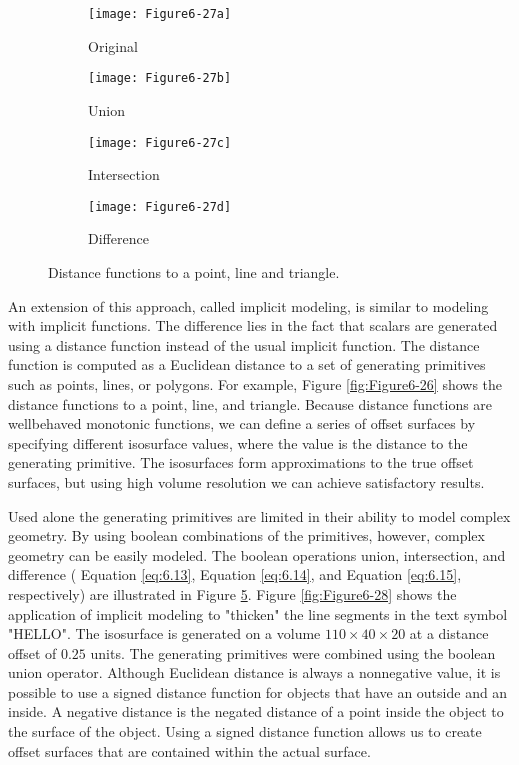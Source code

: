 \begin{figure}[htb]
	\begin{subfigure}[h]{0.24\linewidth}
		\texttt{[image: Figure6-27a]}
		\caption{Original}
		\label{fig:Figure6-27a}
	\end{subfigure}
	\hfill
	\begin{subfigure}[h]{0.24\linewidth}
		\texttt{[image: Figure6-27b]}
		\caption{Union}
		\label{fig:Figure6-27b}
	\end{subfigure}
	\hfill
	\begin{subfigure}[h]{0.24\linewidth}
		\texttt{[image: Figure6-27c]}
		\caption{Intersection}
		\label{fig:Figure6-27c}
	\end{subfigure}
	\begin{subfigure}[h]{0.24\linewidth}
		\texttt{[image: Figure6-27d]}
		\caption{Difference}
		\label{fig:Figure6-27d}
	\end{subfigure}
	\caption{Distance functions to a point, line and triangle.}\label{fig:Figure6-27}
\end{figure}

An extension of this approach, called implicit modeling, is similar to modeling with implicit functions. The difference lies in the fact that scalars are generated using a distance function instead of the usual implicit function. The distance function is computed as a Euclidean distance to a set of generating primitives such as points, lines, or polygons. For example, Figure \ref{fig:Figure6-26} shows the distance functions to a point, line, and triangle. Because distance functions are wellbehaved monotonic functions, we can define a series of offset surfaces by specifying different isosurface values, where the value is the distance to the generating primitive. The isosurfaces form approximations to the true offset surfaces, but using high volume resolution we can achieve satisfactory results.

Used alone the generating primitives are limited in their ability to model complex geometry. By using boolean combinations of the primitives, however, complex geometry can be easily modeled. The boolean operations union, intersection, and difference ( Equation \ref{eq:6.13}, Equation \ref{eq:6.14}, and  Equation \ref{eq:6.15}, respectively) are illustrated in Figure \ref{fig:Figure6-27}. Figure \ref{fig:Figure6-28} shows the application of implicit modeling to "thicken" the line segments in the text symbol "HELLO". The isosurface is generated on a volume $ 110 \times 40 \times 20 $ at a distance offset of $0.25$ units. The generating primitives were combined using the boolean union operator. Although Euclidean distance is always a nonnegative value, it is possible to use a signed distance function for objects that have an outside and an inside. A negative distance is the negated distance of a point inside the object to the surface of the object. Using a signed distance function allows us to create offset surfaces that are contained within the actual surface.

